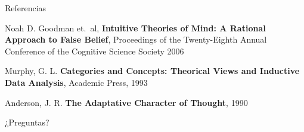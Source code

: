 \documentclass{beamer}
\begin{document}
\begin{frame}[fragile]{Referencias}

\begin{thebibliography}{9}
	Noah D. Goodman et.\ al,
	\textbf{Intuitive Theories of Mind: A Rational Approach to False Belief},
	Proceedings of the Twenty-Eighth Annual Conference of the Cognitive Science Society
	2006

	Murphy, G. L.
	\textbf{Categories and Concepts: Theorical Views and Inductive Data Analysis},
	Academic Press,
	1993

	Anderson, J. R.
	\textbf{The Adaptative Character of Thought},
	1990

\end{thebibliography}

\end{frame}

\begin{frame}

\begin{center}
{\Huge ¿Preguntas?}
\end{center}

\end{frame}
\end{document}
